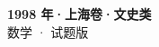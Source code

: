 \documentclass[zihao=-4, a4paper]{ctexart}
\begin{document}
\begin{center}
  {\Large\bfseries 1998 年·上海卷·文史类}\\[4pt]
  {\large 数学 · 试题版}
\end{center}
\medskip
{}

\end{document}
